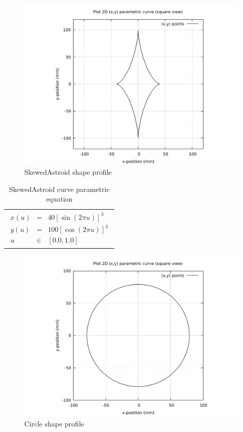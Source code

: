 \begin{figure}
	\caption{SkewedAstroid shape profile}
	\label{SkewedAstroid-curve-plot-BW.pdf}
	\centering
	\includegraphics[width=1.20\textwidth]{Chap3/curve-shape/curves/SkewedAstroid-curve-plot-BW.pdf} 
\end{figure}

\begin{table}[ht]
\begin{center}
\begin{tabular}{ p{16.0cm} }
\caption{SkewedAstroid curve parametric equation}
\begin{eqnarray}
	x(u) & = & 40  [ \sin(2\pi u) ]^3  \nonumber \\
	y(u) & = & 100 [ \cos(2\pi u) ]^3  \nonumber \\
	u & \in & [0.0, 1.0] \nonumber
\end{eqnarray}
\end{tabular}
\end{center}
\end{table}

\clearpage
\pagebreak

\begin{figure}
	\caption{Circle shape profile}
	\label{Circle-curve-plot-BW.pdf}
	\centering
	\includegraphics[width=1.20\textwidth]{Chap3/curve-shape/curves/Circle-curve-plot-BW.pdf} 
\end{figure}

